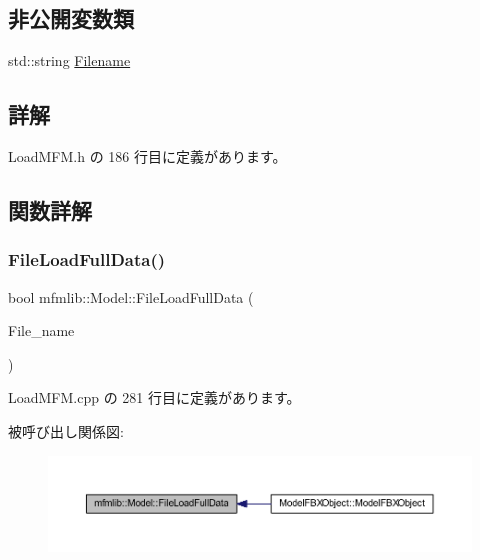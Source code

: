 \subsection*{非公開変数類}
\begin{DoxyCompactItemize}
\item 
std\+::string \mbox{\hyperlink{classmfmlib_1_1_model_a83e1a5e9ec5967b0aae2889672831c21}{Filename}}
\end{DoxyCompactItemize}


\subsection{詳解}


 Load\+M\+F\+M.\+h の 186 行目に定義があります。



\subsection{関数詳解}
\mbox{\label{classmfmlib_1_1_model_a0b260e285347695a8a9f0092b57ddb7f}} 
\subsubsection{\texorpdfstring{File\+Load\+Full\+Data()}{FileLoadFullData()}}
{\footnotesize\ttfamily bool mfmlib\+::\+Model\+::\+File\+Load\+Full\+Data (\begin{DoxyParamCaption}\item[{T\+C\+H\+AR $\ast$}]{File\+\_\+name }\end{DoxyParamCaption})}



 Load\+M\+F\+M.\+cpp の 281 行目に定義があります。

被呼び出し関係図\+:\nopagebreak
\begin{figure}[H]
\begin{center}
\leavevmode
\includegraphics[width=350pt]{classmfmlib_1_1_model_a0b260e285347695a8a9f0092b57ddb7f_icgraph}
\end{center}
\end{figure}
\mbox{\label{classmfmlib_1_1_model_a906eb59ce0373f757c5473512e95c5a4}} 
